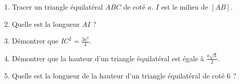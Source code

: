 \Exo
 
\begin{enumerate}
\item Tracer un triangle équilatéral $ABC$ de coté $a$. $I$ est le milieu de $[AB]$. 
\item Quelle est la longueur $AI$ ?
\item Démontrer que $IC^2=\frac{3a^2}{4}$.
\item Démontrer que la hauteur d'un triangle équilatéral est égale à $\frac{a\sqrt3}{2}$.
\item Quelle est la longueur de la hauteur d'un triangle équilatéral de coté 6 ?
\end{enumerate}









